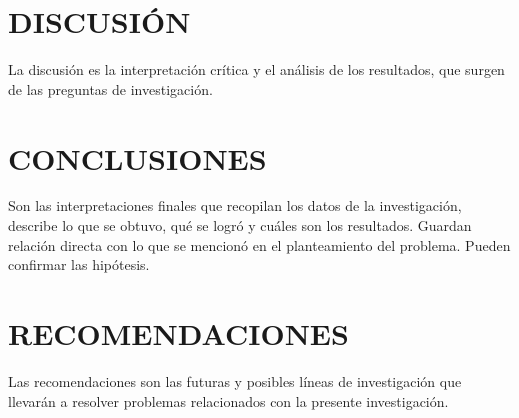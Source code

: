 \section{DISCUSIÓN}


La discusión es la interpretación crítica y el análisis de los resultados, que surgen de las preguntas de investigación.


\newpage


\section{CONCLUSIONES}


Son las interpretaciones finales que recopilan los datos de la investigación, describe lo que se obtuvo, qué se logró y cuáles son los resultados. Guardan relación directa con lo que se mencionó en el planteamiento del problema. Pueden confirmar las hipótesis. 


\newpage


\section{RECOMENDACIONES}


Las recomendaciones son las futuras y posibles líneas de investigación que llevarán a resolver problemas relacionados con la presente investigación.